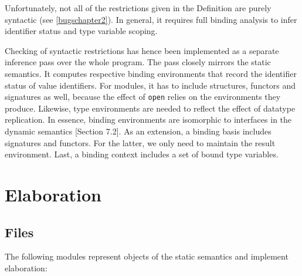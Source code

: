 \documentclass[twoside,titlepage]{article}
\begin{document}
Unfortunately, not all of the restrictions given in the Definition are purely syntactic (see \ref{bugschapter2}). In general, it requires full binding analysis to infer identifier status and type variable scoping.

Checking of syntactic restrictions has hence been implemented as a separate inference pass over the whole program. The pass closely mirrors the static semantics. It computes respective binding environments that record the identifier status of value identifiers. For modules, it has to include structures, functors and signatures as well, because the effect of {\tt open} relies on the environments they produce. Likewise, type environments are needed to reflect the effect of datatype replication. In essence, binding environments are isomorphic to interfaces in the dynamic semantics [Section 7.2]. As an extension, a binding basis includes signatures and functors. For the latter, we only need to maintain the result environment. Last, a binding context includes a set of bound type variables.


\section{Elaboration}
\label{elaboration}

\subsection{Files}
\label{elaborationfiles}

The following modules represent objects of the static semantics and implement elaboration:
\end{document}
